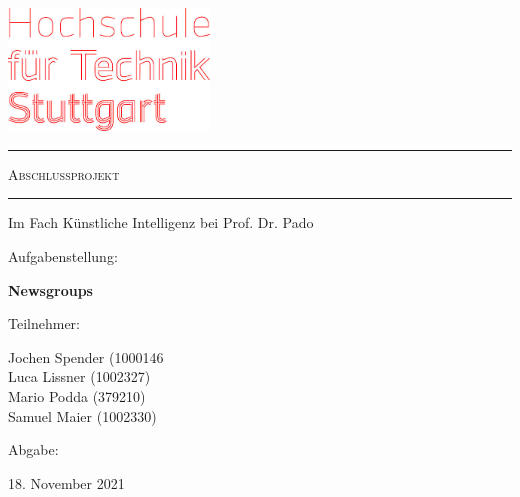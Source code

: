 \documentclass[
	11pt,
	a4paper
]{scrartcl}
\begin{document}
\begin{titlepage}
	\makeatletter
  	\begin{center}   
       \includegraphics[width=0.4\textwidth]{figures/HFT-logo-gross-Aplusheadline.jpg}
       \vspace{2cm}
       
       \textcolor{hft}{\hrule}
       \vspace{0.5cm}
       {\Huge\scshape Abschlussprojekt}
       \vspace{0.5cm}
       \textcolor{hft}{\hrule}
            
       \vspace{2cm}
       {\large Im Fach Künstliche Intelligenz bei Prof. Dr. Pado}
       \vspace{2cm}
       
       
       \begin{flushleft}\quad Aufgabenstellung:\end{flushleft}
       {\large \textbf{Newsgroups}}
       \vspace{1cm}
       
       \begin{flushleft}\quad Teilnehmer:\end{flushleft}
       {\large Jochen Spender (1000146}\\\vspace{0.1cm}
       {\large Luca Lissner (1002327)}\\\vspace{0.1cm}
       {\large Mario Podda (379210)}\\\vspace{0.1cm}
       {\large Samuel Maier (1002330)}
       \vspace{1cm}
       
       \begin{flushleft}\quad Abgabe:\end{flushleft}
       {\large 18. November 2021}
   \end{center}
\end{titlepage}

\tableofcontents
\newpage
\end{document}
